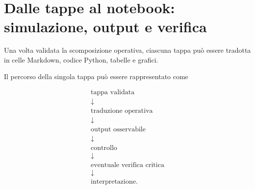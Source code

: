 




\section{Dalle tappe al notebook: simulazione, output e verifica}

Una volta validata la scomposizione operativa, ciascuna tappa pu\`{o} essere
tradotta in celle Markdown, codice Python, tabelle e grafici.

Il percorso della singola tappa pu\`{o} essere rappresentato come

\[
\begin{array}{c}
\text{tappa validata}
\\[3pt]
\downarrow
\\[3pt]
\text{traduzione operativa}
\\[3pt]
\downarrow
\\[3pt]
\text{output osservabile}
\\[3pt]
\downarrow
\\[3pt]
\text{controllo}
\\[3pt]
\downarrow
\\[3pt]
\text{eventuale verifica critica}
\\[3pt]
\downarrow
\\[3pt]
\text{interpretazione}.
\end{array}
\]

